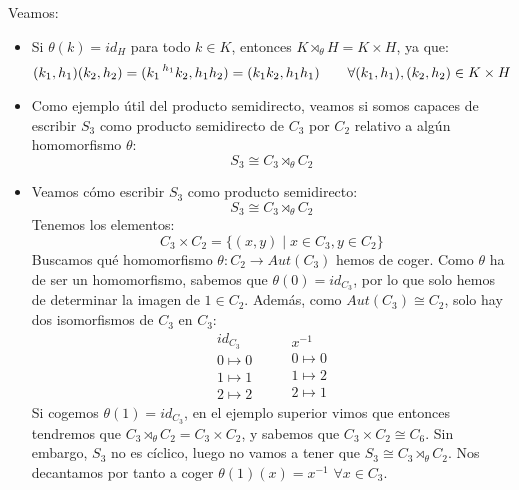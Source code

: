 \begin{ejemplo}
    Veamos:
    \begin{itemize}
        \item Si $\theta(k) = id_H$ para todo $k\in K$, entonces $K\rtimes_\theta H = K\times H$, ya que:
            \begin{equation*}
                (k_1,h_1)(k_2,h_2) = (k_1 \prescript{h_1}{}{k_2}, h_1h_2) = (k_1k_2, h_1h_1) \qquad \forall (k_1,h_1), (k_2,h_2) \in K\times H
            \end{equation*}
        \item Como ejemplo útil del producto semidirecto, veamos si somos capaces de escribir $S_3$ como producto semidirecto de $C_3$ por $C_2$ relativo a algún homomorfismo $\theta$:
            \begin{equation*}
                S_3\cong C_3\rtimes_{\theta} C_2
            \end{equation*}
        \item Veamos cómo escribir $S_3$ como producto semidirecto:
            \begin{equation*}
                S_3 \cong C_3 \rtimes_{\theta} C_2
            \end{equation*}
            Tenemos los elementos:
            \begin{equation*}
                C_3\times C_2 = \{(x,y) \mid x\in C_3, y\in C_2\}
            \end{equation*}
            Buscamos qué homomorfismo $\theta:C_2\to Aut(C_3)$ hemos de coger. Como $\theta$ ha de ser un homomorfismo, sabemos que $\theta(0) = id_{C_3}$, por lo que solo hemos de determinar la imagen de $1\in C_2$. Además, como $Aut(C_3)\cong C_2$, solo hay dos isomorfismos de $C_3$ en $C_3$:
            \begin{equation*}
                \begin{array}{c}
                    id_{C_3} \\
                    0 \longmapsto 0 \\
                    1 \longmapsto 1 \\
                    2 \longmapsto 2
                \end{array} \qquad 
                \begin{array}{c}
                    x^{-1} \\
                    0 \longmapsto 0 \\
                    1 \longmapsto 2 \\
                    2 \longmapsto 1
                \end{array} 
            \end{equation*}
            Si cogemos $\theta(1) = id_{C_3}$, en el ejemplo superior vimos que entonces tendremos que $C_3\rtimes_\theta C_2 = C_3\times C_2$, y sabemos que $C_3\times C_2 \cong C_6$. Sin embargo, $S_3$ no es cíclico, luego no vamos a tener que $S_3 \cong C_3\rtimes_\theta C_2$. Nos decantamos por tanto a coger $\theta(1)(x) = x^{-1}$ $\forall x\in C_3$.\\


\end{itemize}
\end{ejemplo}
